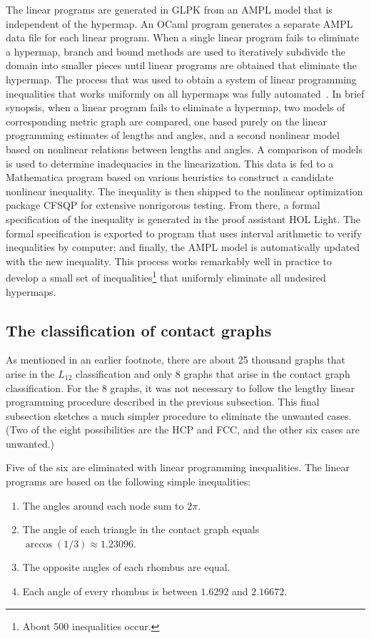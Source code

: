 \documentclass{llncs}
\begin{document}
The linear programs are generated in GLPK from an AMPL model that is
independent of the hypermap.  An OCaml program generates a
separate AMPL data file for each linear program.  When a single linear
program fails to eliminate a hypermap, branch and bound methods are
used to iteratively subdivide the domain into smaller pieces until
linear programs are obtained that eliminate the hypermap.  The process
that was used to obtain a system of linear programming inequalities
that works uniformly on all hypermaps was fully
automated~\cite{Hales:2010:lin-prog}.  In brief synopsis, when a
linear program fails to eliminate a hypermap, two models of
corresponding metric graph are compared, one based purely on the
linear programming estimates of lengths and angles, and a second
nonlinear model based on nonlinear relations between lengths and
angles.  A comparison of models is used to determine inadequacies in
the linearization.  This data is fed to a Mathematica program based on
various heuristics to construct a candidate nonlinear inequality.  The
inequality is then shipped to the nonlinear optimization package
{CFSQP} for extensive nonrigorous testing.  From there, a formal
specification of the inequality is generated in the proof assistant
HOL Light.  The formal specification is exported to program that uses
interval arithmetic to verify inequalities by computer; and finally,
the AMPL model is automatically updated with the new inequality.  This
process works remarkably well in practice to develop a small set of
inequalities\footnote{About 500 inequalities occur.} that
uniformly eliminate all undesired hypermaps.


\subsection{The classification of contact graphs}

As mentioned in an earlier footnote, there are about 25 thousand graphs
that arise in the $L_{12}$ classification and only $8$ graphs that
arise in the contact graph classification. For the $8$ graphs, it was
not necessary to follow the lengthy linear programming procedure
described in the previous subsection.  This final subsection sketches a
much simpler procedure to eliminate the unwanted cases.  (Two of the
eight possibilities are the HCP and FCC, and the other six cases are
unwanted.)

Five of the six are eliminated with linear programming inequalities.
The linear programs are based on the following simple inequalities:
\begin{enumerate}
\item The angles around each node sum to $2\pi$.
\item The angle of each triangle in the contact graph  equals $\arccos(1/3)\approx 1.23096$.
\item The opposite angles of each rhombus are equal.
\item Each angle of every rhombus is between $1.6292$ and $2.16672$.
\end{enumerate}
\end{document}
